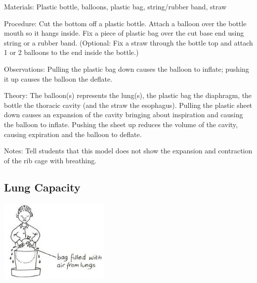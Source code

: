 \begin{multicols}{2}
\begin{description*}
\item[Materials:]{Plastic bottle, balloons, plastic bag, string/rubber band, straw}
\item[Procedure:]{Cut the bottom off a plastic
bottle. Attach a balloon over the
bottle mouth so it hangs inside.
Fix a piece of plastic bag over the
cut base end using string or a rubber band. (Optional: Fix a straw through the bottle top and attach 1 or 2 balloons to the end inside the bottle.)}
\item[Observations:]{Pulling the plastic bag down causes the balloon to inflate; pushing it up causes the balloon the deflate.}
\item[Theory:]{The balloon(s) represents the lung(s), the plastic bag the diaphragm, the bottle the thoracic cavity (and the straw the esophagus). Pulling the plastic sheet down causes an expansion of the cavity bringing about inspiration and causing the balloon to inflate. Pushing the sheet up reduces the volume of the cavity, causing expiration and the balloon to deflate.}
\item[Notes:]{Tell students that this model does not show the expansion and contraction of the rib cage with breathing.}
\end{description*}

\subsection{Lung Capacity} 

\begin{center}
\includegraphics[width=0.4\textwidth]{./img/vso/lung-capacity.jpg}
\end{center}


\end{multicols}
